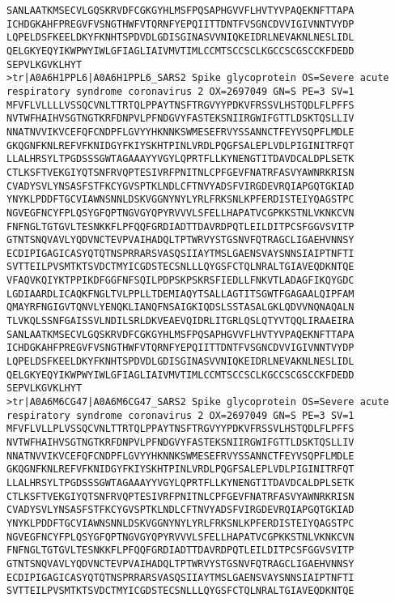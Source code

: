 \documentclass[en,black,12pt,normal]{elegantnote}
\begin{document}
\begin{lstlisting}
SANLAATKMSECVLGQSKRVDFCGKGYHLMSFPQSAPHGVVFLHVTYVPAQEKNFTTAPA
ICHDGKAHFPREGVFVSNGTHWFVTQRNFYEPQIITTDNTFVSGNCDVVIGIVNNTVYDP
LQPELDSFKEELDKYFKNHTSPDVDLGDISGINASVVNIQKEIDRLNEVAKNLNESLIDL
QELGKYEQYIKWPWYIWLGFIAGLIAIVMVTIMLCCMTSCCSCLKGCCSCGSCCKFDEDD
SEPVLKGVKLHYT
>tr|A0A6H1PPL6|A0A6H1PPL6_SARS2 Spike glycoprotein OS=Severe acute respiratory syndrome coronavirus 2 OX=2697049 GN=S PE=3 SV=1
MFVFLVLLLLVSSQCVNLTTRTQLPPAYTNSFTRGVYYPDKVFRSSVLHSTQDLFLPFFS
NVTWFHAIHVSGTNGTKRFDNPVLPFNDGVYFASTEKSNIIRGWIFGTTLDSKTQSLLIV
NNATNVVIKVCEFQFCNDPFLGVYYHKNNKSWMESEFRVYSSANNCTFEYVSQPFLMDLE
GKQGNFKNLREFVFKNIDGYFKIYSKHTPINLVRDLPQGFSALEPLVDLPIGINITRFQT
LLALHRSYLTPGDSSSGWTAGAAAYYVGYLQPRTFLLKYNENGTITDAVDCALDPLSETK
CTLKSFTVEKGIYQTSNFRVQPTESIVRFPNITNLCPFGEVFNATRFASVYAWNRKRISN
CVADYSVLYNSASFSTFKCYGVSPTKLNDLCFTNVYADSFVIRGDEVRQIAPGQTGKIAD
YNYKLPDDFTGCVIAWNSNNLDSKVGGNYNYLYRLFRKSNLKPFERDISTEIYQAGSTPC
NGVEGFNCYFPLQSYGFQPTNGVGYQPYRVVVLSFELLHAPATVCGPKKSTNLVKNKCVN
FNFNGLTGTGVLTESNKKFLPFQQFGRDIADTTDAVRDPQTLEILDITPCSFGGVSVITP
GTNTSNQVAVLYQDVNCTEVPVAIHADQLTPTWRVYSTGSNVFQTRAGCLIGAEHVNNSY
ECDIPIGAGICASYQTQTNSPRRARSVASQSIIAYTMSLGAENSVAYSNNSIAIPTNFTI
SVTTEILPVSMTKTSVDCTMYICGDSTECSNLLLQYGSFCTQLNRALTGIAVEQDKNTQE
VFAQVKQIYKTPPIKDFGGFNFSQILPDPSKPSKRSFIEDLLFNKVTLADAGFIKQYGDC
LGDIAARDLICAQKFNGLTVLPPLLTDEMIAQYTSALLAGTITSGWTFGAGAALQIPFAM
QMAYRFNGIGVTQNVLYENQKLIANQFNSAIGKIQDSLSSTASALGKLQDVVNQNAQALN
TLVKQLSSNFGAISSVLNDILSRLDKVEAEVQIDRLITGRLQSLQTYVTQQLIRAAEIRA
SANLAATKMSECVLGQSKRVDFCGKGYHLMSFPQSAPHGVVFLHVTYVPAQEKNFTTAPA
ICHDGKAHFPREGVFVSNGTHWFVTQRNFYEPQIITTDNTFVSGNCDVVIGIVNNTVYDP
LQPELDSFKEELDKYFKNHTSPDVDLGDISGINASVVNIQKEIDRLNEVAKNLNESLIDL
QELGKYEQYIKWPWYIWLGFIAGLIAIVMVTIMLCCMTSCCSCLKGCCSCGSCCKFDEDD
SEPVLKGVKLHYT
>tr|A0A6M6CG47|A0A6M6CG47_SARS2 Spike glycoprotein OS=Severe acute respiratory syndrome coronavirus 2 OX=2697049 GN=S PE=3 SV=1
MFVFLVLLPLVSSQCVNLTTRTQLPPAYTNSFTRGVYYPDKVFRSSVLHSTQDLFLPFFS
NVTWFHAIHVSGTNGTKRFDNPVLPFNDGVYFASTEKSNIIRGWIFGTTLDSKTQSLLIV
NNATNVVIKVCEFQFCNDPFLGVYYHKNNKSWMESEFRVYSSANNCTFEYVSQPFLMDLE
GKQGNFKNLREFVFKNIDGYFKIYSKHTPINLVRDLPQGFSALEPLVDLPIGINITRFQT
LLALHRSYLTPGDSSSGWTAGAAAYYVGYLQPRTFLLKYNENGTITDAVDCALDPLSETK
CTLKSFTVEKGIYQTSNFRVQPTESIVRFPNITNLCPFGEVFNATRFASVYAWNRKRISN
CVADYSVLYNSASFSTFKCYGVSPTKLNDLCFTNVYADSFVIRGDEVRQIAPGQTGKIAD
YNYKLPDDFTGCVIAWNSNNLDSKVGGNYNYLYRLFRKSNLKPFERDISTEIYQAGSTPC
NGVEGFNCYFPLQSYGFQPTNGVGYQPYRVVVLSFELLHAPATVCGPKKSTNLVKNKCVN
FNFNGLTGTGVLTESNKKFLPFQQFGRDIADTTDAVRDPQTLEILDITPCSFGGVSVITP
GTNTSNQVAVLYQDVNCTEVPVAIHADQLTPTWRVYSTGSNVFQTRAGCLIGAEHVNNSY
ECDIPIGAGICASYQTQTNSPRRARSVASQSIIAYTMSLGAENSVAYSNNSIAIPTNFTI
SVTTEILPVSMTKTSVDCTMYICGDSTECSNLLLQYGSFCTQLNRALTGIAVEQDKNTQE

\end{lstlisting}
\end{document}
